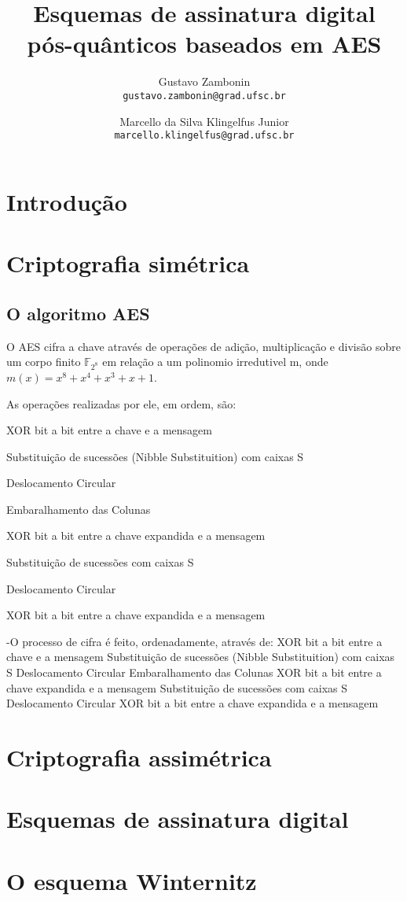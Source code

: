 \documentclass{article}
\title{Esquemas de assinatura digital pós-quânticos baseados em AES}
\author{Gustavo Zambonin \\ \texttt{gustavo.zambonin@grad.ufsc.br} \and Marcello da Silva Klingelfus Junior \\ \texttt{marcello.klingelfus@grad.ufsc.br}}
\date{}
\begin{document}
\maketitle


\section*{Introdução}

\section*{Criptografia simétrica}

\subsection*{O algoritmo AES}

O AES cifra a chave através de operações de adição, multiplicação e divisão sobre um corpo finito $\mathbb{F}_{2^{8}}$ em relação a um polinomio irredutivel m, onde $m(x) = x^{8} + x^{4} + x^{3} + x + 1$. 

As operações realizadas por ele, em ordem, são:

\begin{itemize}

XOR bit a bit entre a chave e a mensagem

Substituição de sucessões (Nibble Substituition) com caixas S

Deslocamento Circular

Embaralhamento das Colunas

XOR bit a bit entre a chave expandida e a mensagem

Substituição de sucessões com caixas S

Deslocamento Circular

XOR bit a bit entre a chave expandida e a mensagem

\end{itemize}
-O processo de cifra é feito, ordenadamente, através de: 
XOR bit a bit entre a chave e a mensagem
Substituição de sucessões (Nibble Substituition) com caixas S
Deslocamento Circular
Embaralhamento das Colunas
XOR bit a bit entre a chave expandida e a mensagem
Substituição de sucessões com caixas S
Deslocamento Circular
XOR bit a bit entre a chave expandida e a mensagem


\section*{Criptografia assimétrica}

\section*{Esquemas de assinatura digital}

\section*{O esquema Winternitz}
\end{document}
